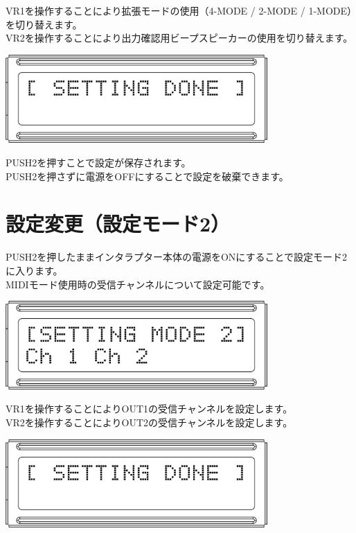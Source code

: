 \documentclass[a4paper,11pt]{jsarticle}
\begin{document}
VR1を操作することにより拡張モードの使用（4-MODE / 2-MODE / 1-MODE）を切り替えます。 \\
VR2を操作することにより出力確認用ビープスピーカーの使用を切り替えます。

\vspace*{10mm}
\begin{center}
\includegraphics[width=100mm]{image/Arduino_Interrupter_v1_LCD_SET_DONE.png}
\end{center}
\vspace*{10mm}

PUSH2を押すことで設定が保存されます。 \\
PUSH2を押さずに電源をOFFにすることで設定を破棄できます。



\clearpage

\section{設定変更（設定モード2）}

PUSH2を押したままインタラプター本体の電源をONにすることで設定モード2に入ります。 \\
MIDIモード使用時の受信チャンネルについて設定可能です。

\vspace*{10mm}
\begin{center}
\includegraphics[width=100mm]{image/Arduino_Interrupter_v1_LCD_SET_2.png}
\end{center}
\vspace*{10mm}

VR1を操作することによりOUT1の受信チャンネルを設定します。 \\
VR2を操作することによりOUT2の受信チャンネルを設定します。 

\vspace*{10mm}
\begin{center}
\includegraphics[width=100mm]{image/Arduino_Interrupter_v1_LCD_SET_DONE.png}
\end{center}
\vspace*{10mm}
\end{document}
